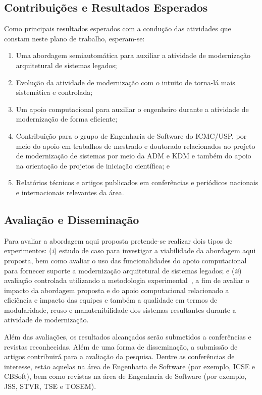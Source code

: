 \documentclass[12pt]{article}
\begin{document}
\subsection{Contribuições e Resultados Esperados}\label{sec:resultados_esperados}

Como principais resultados esperados com a condução das atividades que constam neste plano de trabalho, esperam-se:

\begin{enumerate}
\item Uma abordagem semiautomática  para auxiliar a atividade de modernização arquitetural de sistemas legados;
\item Evolução da atividade de modernização com o intuito de torna-lá mais sistemática e controlada;
\item Um apoio computacional para auxiliar o engenheiro durante a atividade de modernização de forma eficiente;
\item Contribuição para o grupo de Engenharia de Software do ICMC/USP, por meio do apoio em trabalhos de mestrado e doutorado relacionados ao projeto de modernização de sistemas por meio da ADM e KDM e também do apoio na orientação de projetos de iniciação científica; e
\item Relatórios técnicos e artigos publicados em conferências e periódicos nacionais e internacionais relevantes da área.
\end{enumerate}

\subsection{Avaliação e Disseminação}

Para avaliar a abordagem aqui proposta pretende-se realizar dois tipos de experimentos: (\textit{i}) estudo de caso para investigar a viabilidade da abordagem aqui proposta, bem como avaliar o uso das funcionalidades do apoio computacional para fornecer suporte a modernização arquitetural de sistemas legados; e (\textit{ii}) avaliação controlada utilizando a metodologia experimental~\cite{Wohlin}, a fim de avaliar o impacto da abordagem proposta e do apoio computacional relacionado a eficiência e impacto das equipes e também a qualidade em termos de modularidade, reuso e manutenibilidade dos sistemas resultantes durante a atividade de modernização.

Além das avaliações, os resultados alcançados serão submetidos a conferências e revistas reconhecidas. Além de uma forma de disseminação, a submissão de artigos contribuirá para a avaliação da pesquisa. Dentre as conferências de interesse, estão aquelas na área de Engenharia de Software (por exemplo, ICSE e CBSoft), bem como revistas na área de Engenharia de Software (por exemplo, JSS, STVR, TSE e TOSEM).
\end{document}
